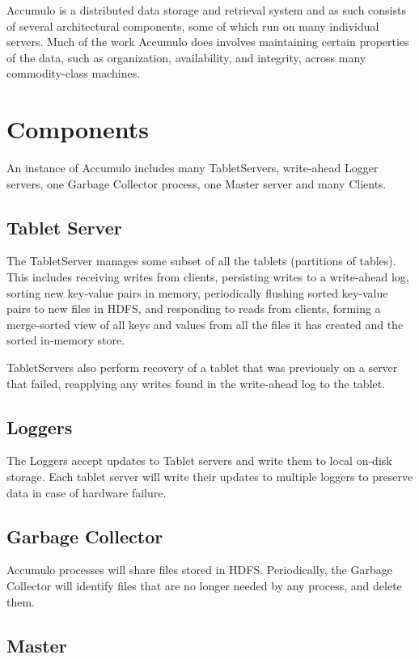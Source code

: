 Accumulo is a distributed data storage and retrieval system and as such consists of
several architectural components, some of which run on many individual servers.
Much of the work Accumulo does involves maintaining certain properties of the
data, such as organization, availability, and integrity, across many commodity-class
machines.

\section{Components}

An instance of Accumulo includes many TabletServers, write-ahead Logger
servers, one Garbage Collector process, one Master server and many Clients.

\subsection{Tablet Server}

The TabletServer manages some subset of all the tablets (partitions of tables). This includes receiving writes from clients, persisting writes to a
write‐ahead log, sorting new key‐value pairs in memory, periodically
flushing sorted key‐value pairs to new files in HDFS, and responding
to reads from clients, forming a merge‐sorted view of all keys and
values from all the files it has created and the sorted in‐memory
store.

TabletServers also perform recovery of a tablet
that was previously on a server that failed, reapplying any writes
found in the write-ahead log to the tablet.

\subsection{Loggers}

The Loggers accept updates to Tablet servers and write them to local
on-disk storage.  Each tablet server will write their updates to
multiple loggers to preserve data in case of hardware failure.

\subsection{Garbage Collector}

Accumulo processes will share files stored in HDFS.  Periodically, the Garbage
Collector will identify files that are no longer needed by any process, and
delete them.

\subsection{Master}


